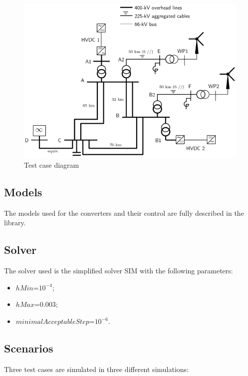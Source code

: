 \documentclass[a4paper, 12pt]{report}
\begin{document}
\begin{figure}[H]
  \includegraphics[width=\textwidth]{GFMGFL.png}
  \caption{Test case diagram}
\end{figure}

\subsection{Models}

\par The models used for the converters and their control are fully described in the \Dynawo library.

\subsection{Solver}

\par The solver used is the simplified solver SIM with the following parameters:

\begin{itemize}
\item $hMin$=$10^{-4}$;
\item $hMax$=$0.003$;
\item $minimalAcceptableStep$=$10^{-6}$.
\end{itemize}

\subsection{Scenarios}

\par Three test cases are simulated in three different simulations:
\end{document}
